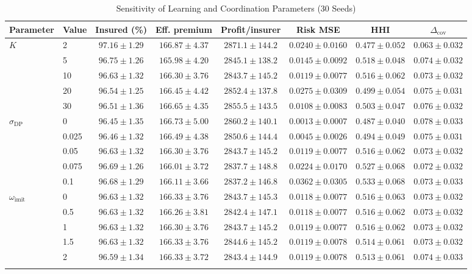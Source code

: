 \begin{table}[t]
\centering
\caption{Sensitivity of Learning and Coordination Parameters (30 Seeds)}
\label{tab:sensitivity_learning}
\scriptsize
\renewcommand{\arraystretch}{1.04}
\setlength{\tabcolsep}{3.2pt}
\begin{tabular}{llcccccc}
\toprule
Parameter & Value & Insured (\%) & Eff. premium & Profit/insurer & Risk MSE & HHI & $\Delta_{\mathrm{cov}}$ \\
\midrule
$K$ & 2 & $97.16 \pm 1.29$ & $166.87 \pm 4.37$ & $2871.1 \pm 144.2$ & $0.0240 \pm 0.0160$ & $0.477 \pm 0.052$ & $0.063 \pm 0.032$ \\
 & 5 & $96.75 \pm 1.26$ & $165.98 \pm 4.20$ & $2845.1 \pm 138.2$ & $0.0145 \pm 0.0092$ & $0.518 \pm 0.048$ & $0.074 \pm 0.032$ \\
 & 10 & $96.63 \pm 1.32$ & $166.30 \pm 3.76$ & $2843.7 \pm 145.2$ & $0.0119 \pm 0.0077$ & $0.516 \pm 0.062$ & $0.073 \pm 0.032$ \\
 & 20 & $96.54 \pm 1.25$ & $166.45 \pm 4.42$ & $2852.4 \pm 137.8$ & $0.0275 \pm 0.0309$ & $0.499 \pm 0.054$ & $0.075 \pm 0.031$ \\
 & 30 & $96.51 \pm 1.36$ & $166.65 \pm 4.35$ & $2855.5 \pm 143.5$ & $0.0108 \pm 0.0083$ & $0.503 \pm 0.047$ & $0.076 \pm 0.032$ \\
\addlinespace
$\sigma_{\mathrm{DP}}$ & 0 & $96.45 \pm 1.35$ & $166.73 \pm 5.00$ & $2860.2 \pm 140.1$ & $0.0013 \pm 0.0007$ & $0.487 \pm 0.040$ & $0.078 \pm 0.033$ \\
 & 0.025 & $96.46 \pm 1.32$ & $166.49 \pm 4.38$ & $2850.6 \pm 144.4$ & $0.0045 \pm 0.0026$ & $0.494 \pm 0.049$ & $0.075 \pm 0.031$ \\
 & 0.05 & $96.63 \pm 1.32$ & $166.30 \pm 3.76$ & $2843.7 \pm 145.2$ & $0.0119 \pm 0.0077$ & $0.516 \pm 0.062$ & $0.073 \pm 0.032$ \\
 & 0.075 & $96.69 \pm 1.26$ & $166.01 \pm 3.72$ & $2837.7 \pm 148.8$ & $0.0224 \pm 0.0170$ & $0.527 \pm 0.068$ & $0.072 \pm 0.032$ \\
 & 0.1 & $96.68 \pm 1.29$ & $166.11 \pm 3.66$ & $2837.2 \pm 146.8$ & $0.0362 \pm 0.0305$ & $0.533 \pm 0.068$ & $0.073 \pm 0.033$ \\
\addlinespace
$\omega_{\mathrm{imit}}$ & 0 & $96.63 \pm 1.32$ & $166.33 \pm 3.76$ & $2843.7 \pm 145.3$ & $0.0118 \pm 0.0077$ & $0.516 \pm 0.063$ & $0.073 \pm 0.032$ \\
 & 0.5 & $96.63 \pm 1.32$ & $166.26 \pm 3.81$ & $2842.4 \pm 147.1$ & $0.0118 \pm 0.0077$ & $0.516 \pm 0.062$ & $0.073 \pm 0.032$ \\
 & 1 & $96.63 \pm 1.32$ & $166.30 \pm 3.76$ & $2843.7 \pm 145.2$ & $0.0119 \pm 0.0077$ & $0.516 \pm 0.062$ & $0.073 \pm 0.032$ \\
 & 1.5 & $96.63 \pm 1.32$ & $166.33 \pm 3.76$ & $2844.6 \pm 145.2$ & $0.0119 \pm 0.0078$ & $0.514 \pm 0.061$ & $0.073 \pm 0.032$ \\
 & 2 & $96.59 \pm 1.34$ & $166.33 \pm 3.72$ & $2843.4 \pm 144.9$ & $0.0119 \pm 0.0078$ & $0.513 \pm 0.061$ & $0.074 \pm 0.033$ \\
\addlinespace
\bottomrule
\end{tabular}
\end{table}
